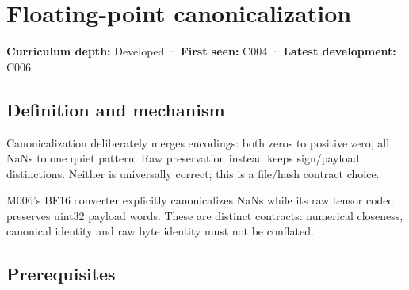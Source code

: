 \hypertarget{appendix-e90053a4b201}{}\label{referencestart:appendix-e90053a4b201}
\section{Floating-point canonicalization}\label{appendix-e90053a4b201-floating-point-canonicalization}

\hypertarget{appendix-e90053a4b201-floating-point-canonicalization}{}

\textbf{Curriculum depth:} Developed · \textbf{First seen:} C004 · \textbf{Latest development:} C006

\begin{allmightroledefinition}

\subsection{Definition and mechanism}\label{appendix-e90053a4b201-definition-and-mechanism}

\hypertarget{appendix-e90053a4b201-definition-and-mechanism}{}

Canonicalization deliberately merges encodings: both zeros to positive zero, all NaNs to one quiet pattern. Raw preservation instead keeps sign/payload distinctions. Neither is universally correct; this is a file/hash contract choice.

\end{allmightroledefinition}

M006's BF16 converter explicitly canonicalizes NaNs while its raw tensor codec preserves uint32 payload words. These are distinct contracts: numerical closeness, canonical identity and raw byte identity must not be conflated.

\subsection{Prerequisites}\label{appendix-e90053a4b201-prerequisites}

\hypertarget{appendix-e90053a4b201-prerequisites}{}

